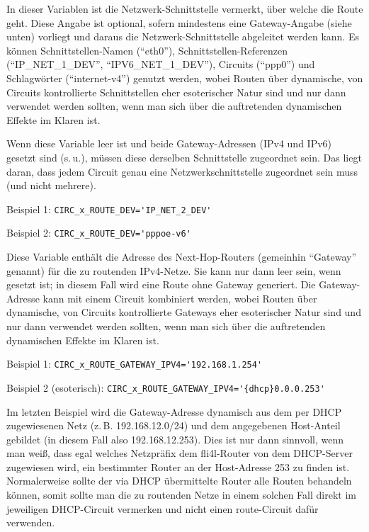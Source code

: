 \begin{description}


In dieser Variablen ist die Netzwerk-Schnittstelle vermerkt, über welche die
Route geht. Diese Angabe ist optional, sofern mindestens eine Gateway-Angabe
(siehe unten) vorliegt und daraus die Netzwerk-Schnittstelle abgeleitet werden
kann. Es können Schnittstellen-Namen (``eth0''), Schnittstellen-Referenzen
(``IP\_NET\_1\_DEV'', ``IPV6\_NET\_1\_DEV''), Circuits (``ppp0'') und
Schlagwörter (``internet-v4'') genutzt werden, wobei Routen über dynamische,
von Circuits kontrollierte Schnittstellen eher esoterischer Natur sind und nur
dann verwendet werden sollten, wenn man sich über die auftretenden dynamischen
Effekte im Klaren ist.

Wenn diese Variable leer ist und beide Gateway-Adressen (IPv4 und IPv6) gesetzt
sind (s.\,u.), müssen diese derselben Schnittstelle zugeordnet sein. Das
liegt daran, dass jedem Circuit genau eine Netzwerkschnittstelle zugeordnet
sein muss (und nicht mehrere).

Beispiel 1: \verb+CIRC_x_ROUTE_DEV='IP_NET_2_DEV'+

Beispiel 2: \verb+CIRC_x_ROUTE_DEV='pppoe-v6'+


Diese Variable enthält die Adresse des Next-Hop-Rou\-ters (gemeinhin ``Gateway''
genannt) für die zu routenden IPv4-Netze. Sie kann nur dann leer sein, wenn
 gesetzt ist; in diesem Fall wird eine Route ohne
Gateway generiert. Die Gateway-Adresse kann mit einem Circuit kombiniert
werden, wobei Routen über dynamische, von Circuits kontrollierte Gateways eher
esoterischer Natur sind und nur dann verwendet werden sollten, wenn man sich
über die auftretenden dynamischen Effekte im Klaren ist.

Beispiel 1: \verb+CIRC_x_ROUTE_GATEWAY_IPV4='192.168.1.254'+

Beispiel 2 (esoterisch): \verb+CIRC_x_ROUTE_GATEWAY_IPV4='{dhcp}0.0.0.253'+

Im letzten Beispiel wird die Gateway-Adresse dynamisch aus dem per DHCP
zugewiesenen Netz (z.\,B. 192.168.12.0/24) und dem angegebenen Host-Anteil
gebildet (in diesem Fall also 192.168.12.253). Dies ist nur dann sinnvoll, wenn
man weiß, dass egal welches Netzpräfix dem fli4l-Router von dem DHCP-Server
zugewiesen wird, ein bestimmter Router an der Host-Adresse 253 zu finden ist.
Normalerweise sollte der via DHCP übermittelte Router alle Routen behandeln
können, somit sollte man die zu routenden Netze in einem solchen Fall direkt
im jeweiligen DHCP-Circuit vermerken und nicht einen route-Circuit dafür
verwenden.


\end{description}
